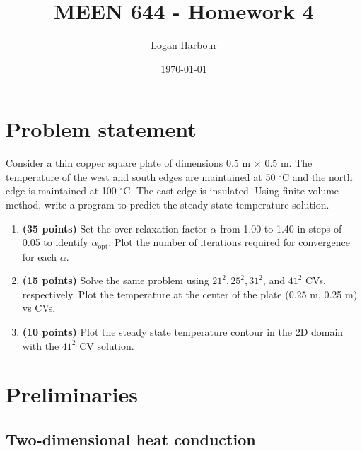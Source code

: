 \documentclass{article}
\newcommand{\pageTitle}{MEEN 644 - Homework 4}
\newcommand{\pageAuthor}{Logan Harbour}
\begin{document}
\title{\LARGE \textbf{\pageTitle} \vspace{-0.3cm}}
\author{\large \pageAuthor}
\date{\vspace{-0.6cm} \large \today \vspace{-0.4cm}}

\maketitle

\section*{Problem statement}

Consider a thin copper square plate of dimensions 0.5 m $\times$ 0.5 m. The temperature of the west and south edges are maintained at 50 $^\circ$C and the north edge is maintained at 100 $^\circ$C. The east edge is insulated. Using finite volume method, write a program to predict the steady-state temperature solution.

\begin{enumerate}[label=(\alph*)]
	\item \textbf{(35 points)} Set the over relaxation factor $\alpha$ from 1.00 to 1.40 in steps of 0.05 to identify $\alpha_\text{opt}$. Plot the number of iterations required for convergence for each $\alpha$.
	\item \textbf{(15 points)} Solve the same problem using $21^2, 25^2, 31^2$, and $41^2$ CVs, respectively. Plot the temperature at the center of the plate (0.25 m, 0.25 m) vs CVs.
	\item \textbf{(10 points)} Plot the steady state temperature contour in the 2D domain with the $41^2$ CV solution.
\end{enumerate}

\section*{Preliminaries}

\subsection*{Two-dimensional heat conduction}
\end{document}

